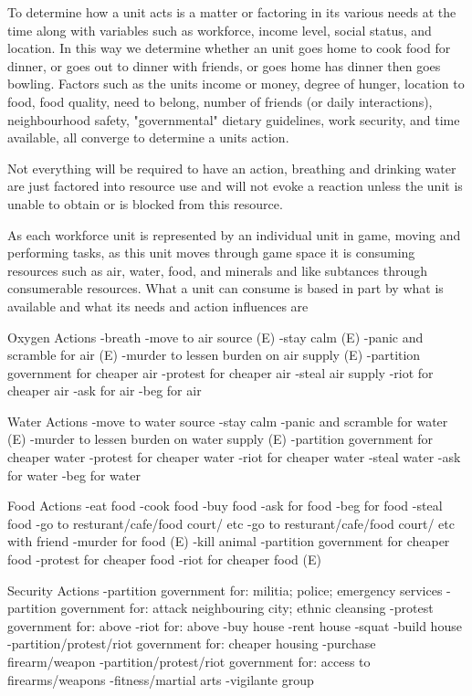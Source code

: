 To determine how a unit acts is a matter or factoring in its various needs at the time along with variables such as workforce, income level, social status, and location. In this way we determine whether an unit goes home to cook food for dinner, or goes out to dinner with friends, or goes home has dinner then goes bowling. Factors such as the units income or money, degree of hunger, location to food, food quality, need to belong, number of friends (or daily interactions), neighbourhood safety, "governmental" dietary guidelines, work security, and time available, all converge to determine a units action. 

Not everything will be required to have an action, breathing and drinking water are just factored into resource use and will not evoke a reaction unless the unit is unable to obtain or is blocked from this resource.

As each workforce unit is represented by an individual unit in game, moving and performing tasks, as this unit moves through game space it is consuming resources such as air, water, food, and minerals and like subtances through consumerable resources. What a unit can consume is based in part by what is available and what its needs and action influences are

Oxygen Actions
-breath 
-move to air source (E)
-stay calm (E)
-panic and scramble for air (E)
-murder to lessen burden on air supply (E)
-partition government for cheaper air
-protest for cheaper air
-steal air supply
-riot for cheaper air
-ask for air
-beg for air

Water Actions
-move to water source
-stay calm
-panic and scramble for water (E)
-murder to lessen burden on water supply (E)
-partition government for cheaper water
-protest for cheaper water
-riot for cheaper water
-steal water
-ask for water
-beg for water


Food Actions
-eat food
-cook food
-buy food
-ask for food
-beg for food
-steal food 
-go to resturant/cafe/food court/ etc
-go to resturant/cafe/food court/ etc with friend
-murder for food (E)
-kill animal
-partition government for cheaper food
-protest for cheaper food
-riot for cheaper food (E)


Security Actions
-partition government for: militia; police; emergency services
-partition government for: attack neighbouring city; ethnic cleansing
-protest government for: above
-riot for: above
-buy house
-rent house
-squat
-build house
-partition/protest/riot government for: cheaper housing
-purchase firearm/weapon
-partition/protest/riot government for: access to firearms/weapons
-fitness/martial arts
-vigilante group



